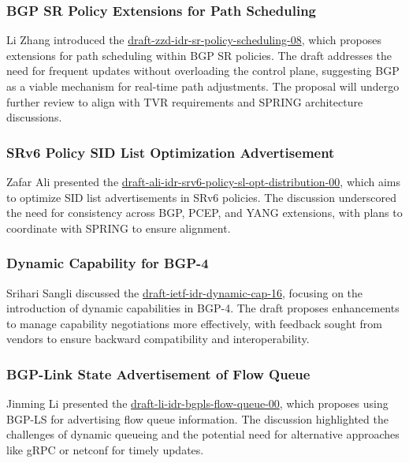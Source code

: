 \documentclass{article}
\begin{document}
\subsubsection{BGP SR Policy Extensions for Path Scheduling}

Li Zhang introduced the \href{https://datatracker.ietf.org/doc/html/draft-zzd-idr-sr-policy-scheduling-08}{draft-zzd-idr-sr-policy-scheduling-08}, which proposes extensions for path scheduling within BGP SR policies. The draft addresses the need for frequent updates without overloading the control plane, suggesting BGP as a viable mechanism for real-time path adjustments. The proposal will undergo further review to align with TVR requirements and SPRING architecture discussions.

\subsubsection{SRv6 Policy SID List Optimization Advertisement}

Zafar Ali presented the \href{https://datatracker.ietf.org/doc/html/draft-ali-idr-srv6-policy-sl-opt-distribution-00}{draft-ali-idr-srv6-policy-sl-opt-distribution-00}, which aims to optimize SID list advertisements in SRv6 policies. The discussion underscored the need for consistency across BGP, PCEP, and YANG extensions, with plans to coordinate with SPRING to ensure alignment.

\subsubsection{Dynamic Capability for BGP-4}

Srihari Sangli discussed the \href{https://datatracker.ietf.org/doc/html/draft-ietf-idr-dynamic-cap-16}{draft-ietf-idr-dynamic-cap-16}, focusing on the introduction of dynamic capabilities in BGP-4. The draft proposes enhancements to manage capability negotiations more effectively, with feedback sought from vendors to ensure backward compatibility and interoperability.

\subsubsection{BGP-Link State Advertisement of Flow Queue}

Jinming Li presented the \href{https://datatracker.ietf.org/doc/html/draft-li-idr-bgpls-flow-queue-00}{draft-li-idr-bgpls-flow-queue-00}, which proposes using BGP-LS for advertising flow queue information. The discussion highlighted the challenges of dynamic queueing and the potential need for alternative approaches like gRPC or netconf for timely updates.
\end{document}
